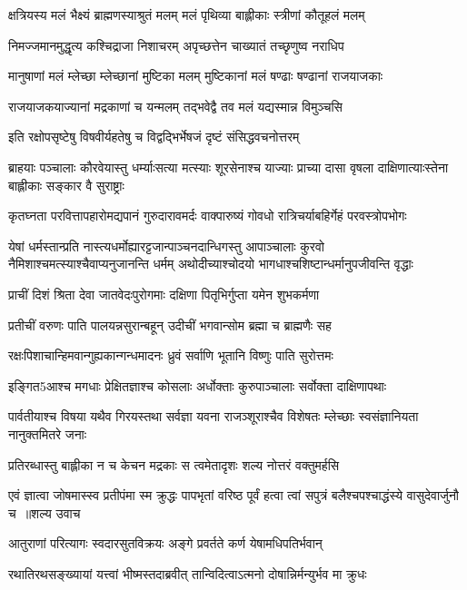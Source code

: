 \twolineshloka
{क्षत्रियस्य मलं भैक्ष्यं ब्राह्मणस्याश्रुतं मलम्}
{मलं पृथिव्या बाह्लीकाः स्त्रीणां कौतूहलं मलम्}


\twolineshloka
{निमज्जमानमुद्धृत्य कश्चिद्राजा निशाचरम्}
{अपृच्छत्तेन चाख्यातं तच्छृणुष्व नराधिप}


\twolineshloka
{मानुषाणां मलं म्लेच्छा म्लेच्छानां मुष्टिका मलम्}
{मुष्टिकानां मलं षण्ढाः षण्ढानां राजयाजकाः}


\twolineshloka
{राजयाजकयाज्यानां मद्रकाणां च यन्मलम्}
{तद्भवेद्वै तव मलं यद्यस्मान्न विमुञ्चसि}


\twolineshloka
{इति रक्षोपसृष्टेषु विषवीर्यहतेषु च}
{विद्वद्भिर्भेषजं दृष्टं संसिद्धवचनोत्तरम्}


\twolineshloka
{ब्राहयाः पञ्चालाः कौरवेयास्तु धर्म्याःसत्या मत्स्याः शूरसेनाश्च याज्याः}
{प्राच्या दासा वृषला दाक्षिणात्याःस्तेना बाह्लीकाः सङ्कार वै सुराष्ट्राः}


\twolineshloka
{कृतघ्नता परवित्तापहारोमद्यपानं गुरुदारावमर्दः}
{वाक्पारुष्यं गोवधो रात्रिचर्याबहिर्गेहं परवस्त्रोपभोगः}


\threelineshloka
{येषां धर्मस्तान्प्रति नास्त्यधर्मोह्यारट्टजान्पाञ्चनदान्धिगस्तु}
{आपाञ्चालाः कुरवो नैमिशाश्चमत्स्याश्चैवाप्यनुजानन्ति धर्मम्}
{अथोदीच्याश्चोदयो भागधाश्चशिष्टान्धर्मानुपजीवन्ति वृद्धाः}


\twolineshloka
{प्राचीं दिशं श्रिता देवा जातवेदःपुरोगमाः}
{दक्षिणा पितृभिर्गुप्ता यमेन शुभकर्मणा}


\twolineshloka
{प्रतीचीं वरुणः पाति पालयन्नसुरान्बहून्}
{उदीचीं भगवान्सोम ब्रह्मा च ब्राह्मणैः सह}


\twolineshloka
{रक्षःपिशाचान्हिमवान्गुह्यकान्गन्धमादनः}
{ध्रुवं सर्वाणि भूतानि विष्णुः पाति सुरोत्तमः}


\twolineshloka
{इङ्गित5आश्च मगधाः प्रेक्षितज्ञाश्च कोसलाः}
{अर्धोक्ताः कुरुपाञ्चालाः सर्वोक्ता दाक्षिणापथाः}


\threelineshloka
{पार्वतीयाश्च विषया यथैव गिरयस्तथा}
{सर्वज्ञा यवना राजञ्शूराश्चैव विशेषतः}
{म्लेच्छाः स्वसंज्ञानियता नानुक्तमितरे जनाः}


\twolineshloka
{प्रतिरब्धास्तु बाह्लीका न च केचन मद्रकाः}
{स त्वमेतादृशः शल्य नोत्तरं वक्तुमर्हसि}


\threelineshloka
{एवं ज्ञात्वा जोषमास्स्व प्रतीपंमा स्म क्रुद्धः पापभृतां वरिष्ठ}
{पूर्वं हत्वा त्वां सपुत्रं बलैश्चपश्चाद्धंस्ये वासुदेवार्जुनौ च ॥शल्य उवाच}
{}


\twolineshloka
{आतुराणां परित्यागः स्वदारसुतविक्रयः}
{अङ्गे प्रवर्तते कर्ण येषामधिपतिर्भवान्}


\twolineshloka
{रथातिरथसङ्ख्यायां यत्त्वां भीष्मस्तदाब्रवीत्}
{तान्विदित्वाऽत्मनो दोषान्निर्मन्युर्भव मा क्रुधः}



